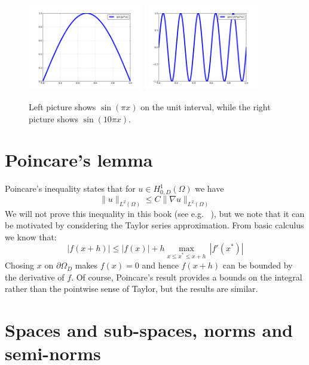 \begin{figure}
\label{fig:sin}
\begin{center}
\includegraphics[width=5cm]{chapters/SobolevCrash/sin.png}
\includegraphics[width=5cm]{chapters/SobolevCrash/sin10.png}
\caption{Left picture shows $\sin(\pi x)$ on the unit interval, while 
the right picture shows $\sin(10 \pi x)$. }\label{fig:sin}
\end{center}
\end{figure}



\section{Poincare's lemma}
\label{sec:poincare}
Poincare's inequality states that for $u\in  H^1_{0, D}(\Omega)$ we have
\begin{equation} 
\label{poincare}
\|u\|_{L^2(\Omega)}  \le C \| \nabla u\|_{L^2(\Omega)} 
\end{equation} 
We will not prove this inequality in this book (see e.g. ~\cite{evans2022partial}),  
but we note that it can be motivated by considering the Taylor series approximation. 
From basic calculus we know that: 
\[
|f(x+h)|  \le |f(x)| + h \max_{x \le x^* \le x+h } \,  |f'(x^*) | 
\]
Chosing $x$ on $\partial \Omega_D$ makes $f(x)=0$ and hence $f(x+h)$ can be bounded by the derivative
of $f$. Of course, Poincare's result provides a bounds on the integral rather than the pointwise sense 
of Taylor, but the results are similar. 


\section{Spaces and sub-spaces, norms and semi-norms}

